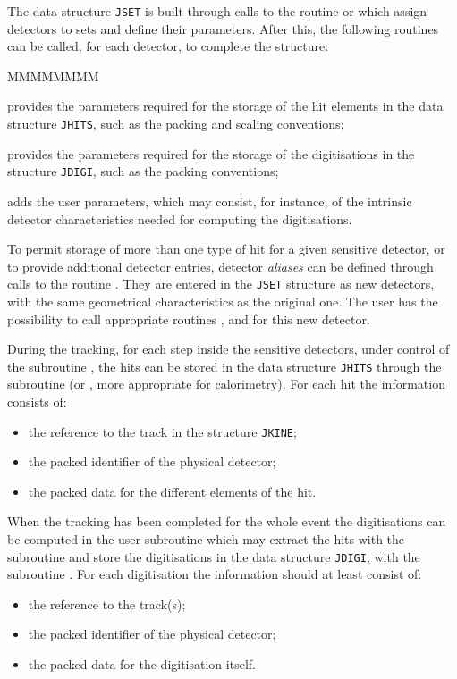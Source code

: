 The data structure {\tt JSET} is built through
calls to the routine   or 
which assign detectors to
sets and define their parameters. After this, the
following routines can be called, for each detector, to complete the structure:
\begin{DLtt}{MMMMMMMM}
\item[\Rind{GSDETH}] provides the parameters required for the storage of the
hit elements in the data structure {\tt JHITS},
such as the packing and scaling conventions;
\item[\Rind{GSDETD}] provides the parameters required for the storage of
the digitisations in the structure {\tt JDIGI},
such as the packing conventions;
\item[\Rind{GSDETU}] adds the user parameters, which may consist,
for instance, of the intrinsic detector
characteristics needed for computing the digitisations.
\end{DLtt}

To permit storage of more than one type of hit for a given sensitive
detector, or to provide additional detector entries,
detector {\it aliases} can be defined through calls to the routine
. They are entered in the {\tt JSET} structure as new detectors,
with the same geometrical characteristics as the original one.
The user has the possibility to call appropriate routines
,  and  for this new detector.

During the tracking, for each step inside the
sensitive detectors, under control of the subroutine
, the hits can be stored in the data structure
{\tt JHITS} through the subroutine  (or , more
appropriate for calorimetry).
For each hit the information consists of:
\begin{itemize}
\item the reference to the track in the structure {\tt JKINE};
\item the packed identifier of the physical detector;
\item the packed data for the different elements of the hit.
\end{itemize}

When the tracking has been completed for the whole
event the digitisations can be
computed in the user subroutine  which
may extract the hits with the subroutine  and
store the digitisations in the data structure {\tt JDIGI}, with
the subroutine .
For each digitisation the information should at least consist of:
\begin{itemize}
\item the reference to the track(s);
\item the packed identifier of the physical detector;
\item the packed data for the digitisation itself.
\end{itemize}

